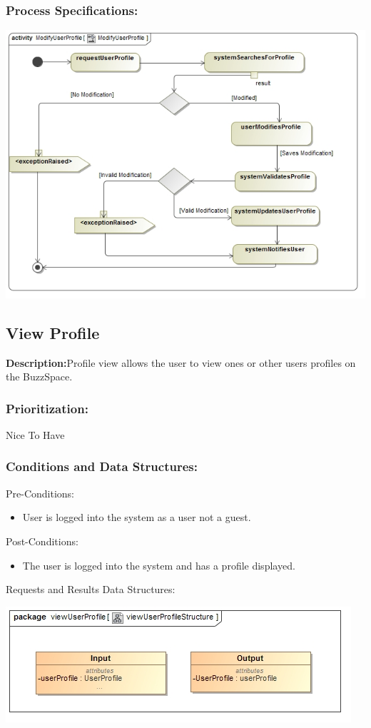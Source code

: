 \documentclass[a4paper,11pt]{article}
\begin{document}
\subsubsection{Process Specifications:} 
\includegraphics[width=1\linewidth]{./Images/UserProfile/ModifyUserProfileActivity}


\subsection{View Profile}
\textbf{Description:}Profile view allows the user to view ones or other users profiles on the BuzzSpace.
\subsubsection{Prioritization:} 
\textbf{}Nice To Have
\subsubsection{Conditions and Data Structures:}
\textbf{}{Pre-Conditions:}
\begin{itemize}
\item User is logged into the system as a user not a guest. 
\end{itemize}
\textbf{}{Post-Conditions:}
\begin{itemize}
\item The user is logged into the system and has a profile displayed.
\end{itemize}
\textbf{}{Requests and Results Data Structures:}
\begin{center}
\includegraphics[width=1\linewidth]{./Images/UserProfile/ViewUserProfileStructure}
\end{center}
\end{document}
